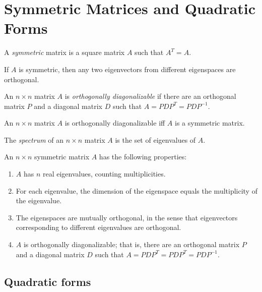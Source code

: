 \documentclass{article}
\begin{document}
\section{Symmetric Matrices and Quadratic Forms}

\begin{defn}
    A \emph{symmetric} matrix is a square matrix \(A\) such that \(A^T=A\).
\end{defn}

\begin{thm}
    If \(A\) is symmetric, then any two eigenvectors from different eigenspaces are orthogonal.
\end{thm}

\begin{defn}
    An \(n \times n\) matrix \(A\) is \emph{orthogonally diagonalizable} if there are an orthogonal matrix \(P\) and a diagonal matrix \(D\) such that \(A=PDP^T=PDP^{-1}\).
\end{defn}

\begin{thm}
    An \(n\times n\) matrix \(A\) is orthogonally diagonalizable iff \(A\) is a symmetric matrix.
\end{thm}

\begin{defn}
    The \emph{spectrum} of an \(n\times n\) matrix \(A\) is the set of eigenvalues of \(A\).
\end{defn}

\begin{thm} 
    An \(n \times n\) symmetric matrix \(A\) has the following properties:
    \begin{enumerate}
        \item[a.] \(A\) has \(n\) real eigenvalues, counting multiplicities.
        \item[b.] For each eigenvalue, the dimension of the eigenspace equals the multiplicity of the eigenvalue.
        \item[c.] The eigenspaces are mutually orthogonal, in the sense that eigenvectors corresponding to different eigenvalues are orthogonal.
        \item[d.] \(A\) is orthogonally diagonalizable; that is, there are an orthogonal matrix \(P\) and a diagonal matrix \(D\) such that \(A=PDP^T=PDP^T=PDP^{-1}\).
    \end{enumerate}
\end{thm}

\subsection{Quadratic forms}
\end{document}

